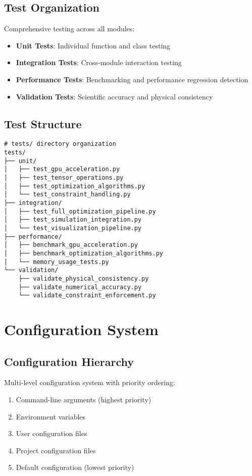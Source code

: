 \documentclass{article}
\begin{document}
\subsection{Test Organization}

Comprehensive testing across all modules:

\begin{itemize}
\item \textbf{Unit Tests}: Individual function and class testing
\item \textbf{Integration Tests}: Cross-module interaction testing
\item \textbf{Performance Tests}: Benchmarking and performance regression detection
\item \textbf{Validation Tests}: Scientific accuracy and physical consistency
\end{itemize}

\subsection{Test Structure}

\begin{lstlisting}
# tests/ directory organization
tests/
├── unit/
│   ├── test_gpu_acceleration.py
│   ├── test_tensor_operations.py
│   ├── test_optimization_algorithms.py
│   └── test_constraint_handling.py
├── integration/
│   ├── test_full_optimization_pipeline.py
│   ├── test_simulation_integration.py
│   └── test_visualization_pipeline.py
├── performance/
│   ├── benchmark_gpu_acceleration.py
│   ├── benchmark_optimization_algorithms.py
│   └── memory_usage_tests.py
└── validation/
    ├── validate_physical_consistency.py
    ├── validate_numerical_accuracy.py
    └── validate_constraint_enforcement.py
\end{lstlisting}

\section{Configuration System}

\subsection{Configuration Hierarchy}

Multi-level configuration system with priority ordering:

\begin{enumerate}
\item Command-line arguments (highest priority)
\item Environment variables
\item User configuration files
\item Project configuration files
\item Default configuration (lowest priority)
\end{enumerate}
\end{document}

